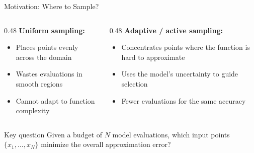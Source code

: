 \documentclass[aspectratio=169,11pt]{beamer}
\newcommand{\emphc}[1]{\textcolor{harvardcrimson}{#1}}
\begin{document}
\begin{frame}{Motivation: Where to Sample?}
\begin{columns}[T]
\begin{column}{0.48\textwidth}
\textbf{Uniform sampling:}
\begin{itemize}
  \item Places points evenly across the domain
  \item Wastes evaluations in smooth regions
  \item Cannot adapt to function complexity
\end{itemize}
\end{column}
\begin{column}{0.48\textwidth}
\textbf{Adaptive / active sampling:}
\begin{itemize}
  \item Concentrates points where the function is \emphc{hard to approximate}
  \item Uses the model's \emphc{uncertainty} to guide selection
  \item Fewer evaluations for the same accuracy
\end{itemize}
\end{column}
\end{columns}

\vspace{0.5cm}
\begin{alertblock}{Key question}
Given a budget of $N$ model evaluations, which input points $\{x_1, \dots, x_N\}$ minimize the overall approximation error?
\end{alertblock}
\end{frame}
\end{document}
